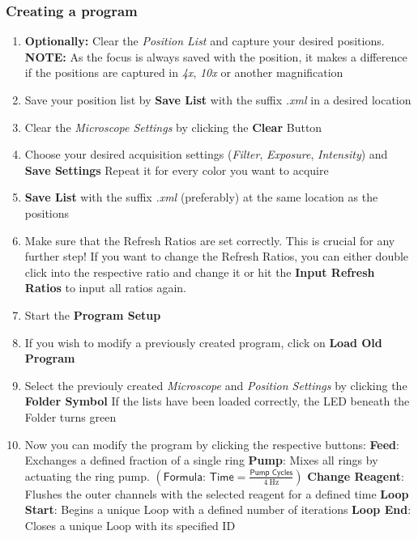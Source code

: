 \documentclass{article}
\newcounter{ListCounter}
\begin{document}
	\subsubsection{Creating a program}
	\begin{enumerate}
		\setcounter{enumi}{\value{ListCounter}}
	\item \textbf{Optionally: }Clear the \textit{Position List} and capture your desired positions.
	\subitem \textbf{NOTE:} As the focus is always saved with the position, it makes a difference if the positions are captured in \textit{4x}, \textit{10x} or another magnification
	\item Save your position list by \textbf{Save List} with the suffix \textit{.xml} in a desired location
	\item Clear the \textit{Microscope Settings} by clicking the \textbf{Clear} Button
	\item Choose your desired acquisition settings (\textit{Filter}, \textit{Exposure}, \textit{Intensity}) and \textbf{Save Settings}
	\subitem Repeat it for every color you want to acquire
	\item \textbf{Save List} with the suffix \textit{.xml} (preferably) at the same location as the positions
	\item Make sure that the Refresh Ratios are set correctly. This is crucial for any further step!
	\subitem If you want to change the Refresh Ratios, you can either double click into the respective ratio and change it or hit the \textbf{Input Refresh Ratios} to input all ratios again.
	\item Start the \textbf{Program Setup}
	\item If you wish to modify a previously created program, click on \textbf{Load Old Program}
	\item Select the previouly created \textit{Microscope} and \textit{Position Settings} by clicking the \textbf{Folder Symbol}
	\subitem If the lists have been loaded correctly, the LED beneath the Folder turns green
	\item Now you can modify the program by clicking the respective buttons:
	\subitem \textbf{Feed}: Exchanges a defined fraction of a single ring
	\subitem \textbf{Pump}: Mixes all rings by actuating the ring pump. $\left(\textsf{Formula:\ Time}=\frac{\textsf{Pump\ Cycles}}{\SI{4}{\hertz}}\right)$
	\subitem \textbf{Change Reagent}: Flushes the outer channels with the selected reagent for a defined time
	\subitem \textbf{Loop Start}: Begins a unique Loop with a defined number of iterations 
	\subitem \textbf{Loop End}: Closes a unique Loop with its specified ID

\end{enumerate}
\end{document}
